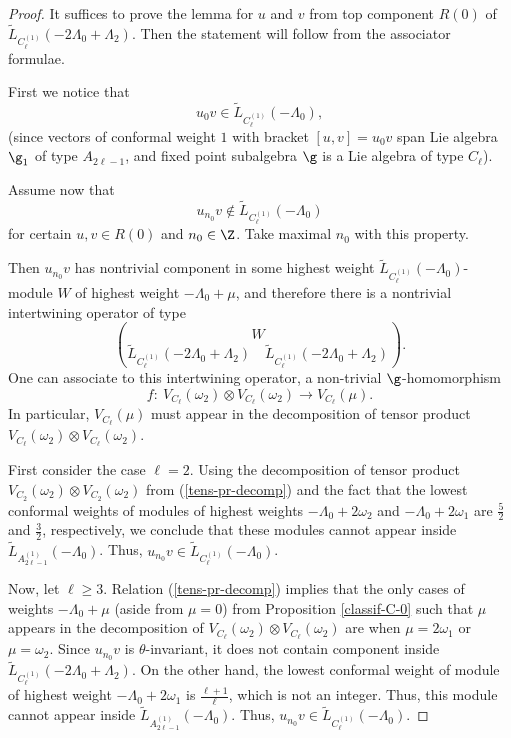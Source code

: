 \documentclass[pdftex]{sigma}
\begin{document}
\begin{proof} It suf\/f\/ices to prove the lemma for $u$ and $v$ from top component $R(0)$  of $\widetilde{L}_{C_{\ell} ^{(1)}} (-2\Lambda_0 +
\Lambda_2)$. Then the statement will follow from the associator
formulae.

First we notice that \[ u _0 v \in \widetilde{L}_{C_{\ell} ^{(1)}}
(-\Lambda_0),\]
(since  vectors of conformal weight $1$ with bracket $[u,v] =u_0 v$
span   Lie algebra ${\g}_1$ of type $A_{2 \ell -1}$, and f\/ixed point
subalgebra ${\g}$ is a Lie algebra of type $C_{\ell}$).

Assume now that    \[ u_{n_0} v \notin \widetilde{L}_{C_{\ell}
^{(1)}} (-\Lambda_0)\]
for certain $u, v \in R(0)$ and $n_0 \in {\Z}$. Take maximal $n_0$
with this property.

 Then  $u_{n_0}  v$ has nontrivial component  in some highest weight $\widetilde{L}_{C_{\ell} ^{(1)}}
(-\Lambda_0)$-module $W$  of highest weight $-\Lambda_0 + \mu$, and
therefore there is a nontrivial intertwining operator of type
\[ {W \choose \widetilde{L}_{C_{\ell} ^{(1)}} (-2\Lambda_0 +
\Lambda_2) \quad \widetilde{L}_{C_{\ell} ^{(1)}} (-2\Lambda_0 +
\Lambda_2) }. \]
One can associate to this intertwining operator, a non-trivial
$\g$-homomorphism \[ f: \  V_{C_{\ell}}(\omega _2) \otimes
V_{C_{\ell}}(\omega _2)  \rightarrow V_{C_{\ell}}(\mu).\] In
particular, $V_{C_{\ell}}(\mu)$ must appear in the decomposition of
tensor product $V_{C_{\ell}}(\omega _2) \otimes V_{C_{\ell}}(\omega
_2)$.

First consider the case $\ell =2$. Using the decomposition of tensor
product $V_{C_{2}}(\omega _2) \otimes V_{C_{2}}(\omega _2)$ from
(\ref{tens-pr-decomp}) and the fact that the lowest conformal
weights of modules of highest weights $-\Lambda_0 + 2 \omega _2$ and
$-\Lambda_0 + 2 \omega _1$ are $\frac{5}{2}$ and $\frac{3}{2}$,
respectively, we conclude that these modules cannot appear inside
$\widetilde{L}_{A_{2 \ell -1} ^{(1)}} (-\Lambda_0)$. Thus, $u_{n_0}
v \in \widetilde{L}_{C_{\ell} ^{(1)}} (-\Lambda_0)$.

Now, let $\ell \geq 3$. Relation (\ref{tens-pr-decomp}) implies that
the only cases of weights $-\Lambda_0 + \mu$ (aside from $\mu =0$)
from Proposition \ref{classif-C-0} such that $\mu$ appears in the
decomposition of $V_{C_{\ell}}(\omega _2) \otimes
V_{C_{\ell}}(\omega _2)$ are when $\mu = 2 \omega _1$ or $\mu =
\omega _2$. Since  $u_{n_0} v$ is $\theta$-invariant, it does not
contain component inside $\widetilde{L}_{C_{\ell} ^{(1)}}
(-2\Lambda_0 + \Lambda_2)$. On the other hand, the lowest conformal
weight of module of highest weight $-\Lambda_0 + 2 \omega _1$ is
$\frac{\ell + 1}{\ell}$, which is not an integer. Thus, this module
cannot appear inside $\widetilde{L}_{A_{2 \ell -1} ^{(1)}}
(-\Lambda_0)$. Thus, $u_{n_0} v \in \widetilde{L}_{C_{\ell} ^{(1)}}
(-\Lambda_0)$.
\end{proof}
\end{document}
